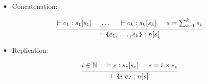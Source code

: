 \documentclass{article}
\newcommand{\type}[3]{\vdash#2:#1[#3]}
\begin{document}
\begin{itemize}[leftmargin=*]
    \item Concatenation:

          \begin{equation*}
              \begin{prooftree}
                  \hypo{\type{s_1}{e_1}{s_1}}
                  \hypo{\dots}
                  \hypo{\type{s_k}{e_k}{s_k}}
                  \hypo{s = \sum_{i=1}^{k} s_i}
                  \infer4{\type{n}{\texttt{\{}e_1, \texttt{\dots}, e_k \texttt{\}}}{s}}
              \end{prooftree}
          \end{equation*}

    \item Replication:

          \begin{equation*}
              \begin{prooftree}
                  \hypo{i \in \mathbb{N}}
                  \hypo{\type{s_e}{e}{s_e}}
                  \hypo{s = i \times s_e}
                  \infer3{\type{n}{\texttt{\{}i~e\texttt{\}}}{s}}
              \end{prooftree}
          \end{equation*}
\end{itemize}
\end{document}
